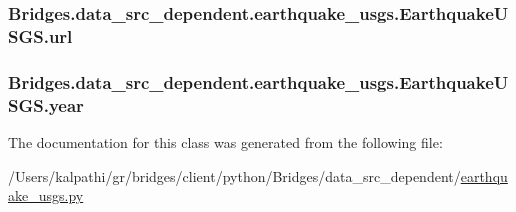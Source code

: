 \subsubsection[{url}]{\setlength{\rightskip}{0pt plus 5cm}Bridges.\+data\+\_\+src\+\_\+dependent.\+earthquake\+\_\+usgs.\+Earthquake\+U\+S\+G\+S.\+url}\label{class_bridges_1_1data__src__dependent_1_1earthquake__usgs_1_1_earthquake_u_s_g_s_a1a7fcadbb52ac42ff2bc2de24906140f}
\hypertarget{class_bridges_1_1data__src__dependent_1_1earthquake__usgs_1_1_earthquake_u_s_g_s_ac1162d042b61c513255931b5e218b5f8}{}
\subsubsection[{year}]{\setlength{\rightskip}{0pt plus 5cm}Bridges.\+data\+\_\+src\+\_\+dependent.\+earthquake\+\_\+usgs.\+Earthquake\+U\+S\+G\+S.\+year}\label{class_bridges_1_1data__src__dependent_1_1earthquake__usgs_1_1_earthquake_u_s_g_s_ac1162d042b61c513255931b5e218b5f8}


The documentation for this class was generated from the following file\+:\begin{DoxyCompactItemize}
\item 
/\+Users/kalpathi/gr/bridges/client/python/\+Bridges/data\+\_\+src\+\_\+dependent/\hyperlink{earthquake__usgs_8py}{earthquake\+\_\+usgs.\+py}\end{DoxyCompactItemize}
